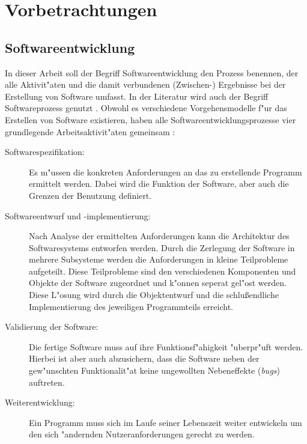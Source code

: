 \chapter{Vorbetrachtungen}

\section{Softwareentwicklung}

In dieser Arbeit soll der Begriff Softwareentwicklung den Prozess benennen, der alle Aktivit"aten und die damit verbundenen (Zwischen-) Ergebnisse bei der Erstellung von Software umfasst.
In der Literatur wird auch der Begriff Softwareprozess genutzt \cite{Sommerville2001a}.
Obwohl es verschiedene Vorgehensmodelle f"ur das Erstellen von Software existieren, haben alle Softwareentwicklungsprozesse vier grundlegende Arbeitsaktivit"aten gemeinsam \cite{Brugge2004a,Sommerville2001a}:
\begin{description}
	\item[Softwarespezifikation:] Es m"ussen die konkreten Anforderungen an das zu erstellende Programm ermittelt werden.
								  Dabei wird die Funktion der Software, aber auch die Grenzen der Benutzung definiert.
	\item[Softwareentwurf und -implementierung:] Nach Analyse der ermittelten Anforderungen kann die Architektur des Softwaresystems entworfen werden.
												 Durch die Zerlegung der Software in mehrere Subsysteme werden die Anforderungen in kleine Teilprobleme aufgeteilt.
												 Diese Teilprobleme sind den verschiedenen Komponenten und Objekte der Software zugeordnet und k"onnen seperat gel"ost werden.
												 Diese L"osung wird durch die Objektentwurf und die schlu\ss endliche Implementierung des jeweiligen Programmteils erreicht.
	\item[Validierung der Software:] Die fertige Software muss auf ihre Funktionsf"ahigkeit "uberpr"uft werden.
									 Hierbei ist aber auch abzusichern, dass die Software neben der gew"unschten Funktionalit"at keine ungewollten Nebeneffekte (\emph{bugs}) auftreten.
	\item[Weiterentwicklung:] Ein Programm muss sich im Laufe seiner Lebenszeit weiter entwickeln um den sich "andernden Nutzeranforderungen gerecht zu werden.
\end{description}

